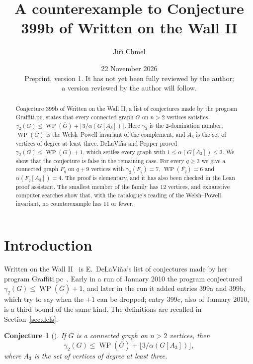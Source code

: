 \documentclass[11pt,a4paper]{article}
\title{A counterexample to Conjecture 399b of Written on the Wall II}
\author{Ji\v{r}\'{\i} Chmel}
\date{22 November 2026\\[1ex]
\small Preprint, version 1. It has not yet been fully reviewed by the author;\\
a version reviewed by the author will follow.}
\newtheorem{conjecture}{Conjecture}
\theoremstyle{definition}
\theoremstyle{remark}
\newcommand{\Gc}{\overline{G}}
\newcommand{\WP}{\operatorname{WP}}
\newcommand{\flr}[1]{\lfloor #1\rfloor}
\begin{document}
\maketitle

\begin{abstract}
Conjecture 399b of Written on the Wall II, a list of conjectures made by the program Graffiti.pc,
states that every connected graph $G$ on $n>2$ vertices satisfies
$\gamma_2(G)\le\WP(\Gc)+\flr{3/\alpha(G[A_3])}$. Here $\gamma_2$ is the 2-domination number,
$\WP(\Gc)$ is the Welsh--Powell invariant of the complement, and $A_3$ is the set of vertices of
degree at least three. DeLaVi\~na and Pepper proved $\gamma_2(G)\le\WP(\Gc)+1$, which settles
every graph with $1\le\alpha(G[A_3])\le 3$. We show that the conjecture is false in the remaining
case. For every $q\ge 3$ we give a connected graph $F_q$ on $q+9$ vertices with
$\gamma_2(F_q)=7$, $\WP(\overline{F_q})=6$ and $\alpha(F_q[A_3])=4$. The proof is elementary, and
it has also been checked in the Lean proof assistant. The smallest member of the family has 12
vertices, and exhaustive computer searches show that, with the catalogue's reading of the
Welsh--Powell invariant, no counterexample has 11 or fewer.
\end{abstract}

\section{Introduction}

Written on the Wall II~\cite{wowii} is E.~DeLaVi\~na's list of conjectures made by her program
Graffiti.pc~\cite{gpc}. Early in a run of January 2010 the program conjectured
$\gamma_2(G)\le\WP(\Gc)+1$, and later in the run it added entries 399a and 399b, which try to say
when the $+1$ can be dropped; entry 399c, also of January 2010, is a third bound of the same kind.
The definitions are recalled in Section~\ref{sec:defs}.

\begin{conjecture}[\cite{wowii}]
If $G$ is a connected graph on $n>2$ vertices, then
\[
\gamma_2(G)\le\WP(\Gc)+\flr{3/\alpha(G[A_3])},
\]
where $A_3$ is the set of vertices of degree at least three.
\end{conjecture}
\end{document}
